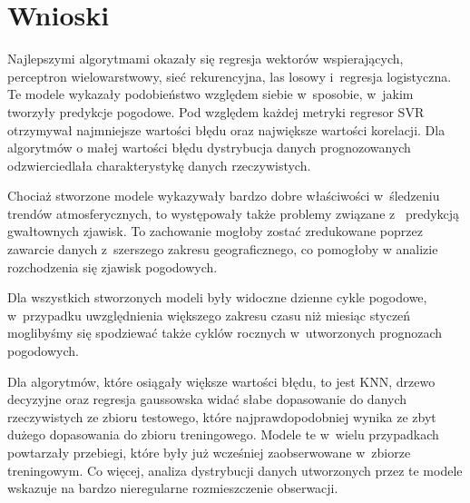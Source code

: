 


\section*{Wnioski}\label{sec:conclusions}


Najlepszymi algorytmami okazały się regresja wektorów wspierających, perceptron
wielowarstwowy, sieć rekurencyjna, las losowy i~regresja logistyczna. Te modele
wykazały podobieństwo względem siebie w~sposobie, w~jakim tworzyły predykcje 
pogodowe. Pod względem każdej metryki regresor SVR otrzymywał najmniejsze 
wartości błędu oraz największe wartości korelacji. Dla algorytmów 
o małej wartości błędu dystrybucja danych prognozowanych odzwierciedlała
charakterystykę danych rzeczywistych.

Chociaż stworzone modele wykazywały bardzo dobre właściwości w~śledzeniu
trendów atmosferycznych, to występowały także problemy związane z~
predykcją gwałtownych zjawisk. To zachowanie mogłoby zostać zredukowane
poprzez zawarcie danych z~szerszego zakresu geograficznego, co pomogłoby 
w analizie rozchodzenia się zjawisk pogodowych. 

Dla wszystkich stworzonych modeli były widoczne dzienne cykle pogodowe, w~przypadku
uwzględnienia większego zakresu czasu niż miesiąc styczeń moglibyśmy się spodziewać
także cyklów rocznych w~utworzonych prognozach pogodowych.

Dla algorytmów, które osiągały większe wartości błędu, to jest KNN, drzewo decyzyjne
oraz regresja gaussowska widać słabe dopasowanie do danych rzeczywistych ze zbioru 
testowego, które najprawdopodobniej wynika ze zbyt dużego dopasowania do zbioru treningowego.
Modele te w~wielu przypadkach powtarzały przebiegi, które były już wcześniej
zaobserwowane w~zbiorze treningowym. Co więcej, analiza dystrybucji danych utworzonych
przez te modele wskazuje na bardzo nieregularne rozmieszczenie obserwacji.

